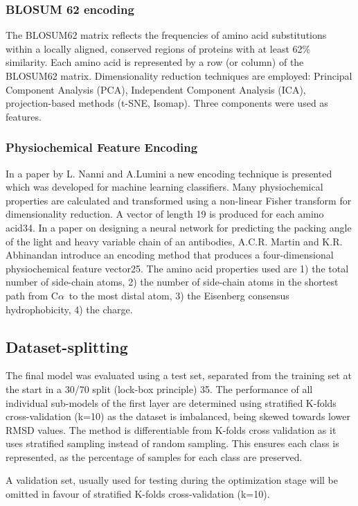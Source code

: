 \documentclass[12pt]{article}
\newcommand{\ca}{\mbox{C$\alpha$}}
\begin{document}
\subsubsection{BLOSUM 62 encoding}
The BLOSUM62 matrix reflects the frequencies of amino acid
substitutions within a locally aligned, conserved regions of proteins
with at least 62\% similarity. Each amino acid is represented by a row
(or column) of the BLOSUM62 matrix. Dimensionality reduction
techniques are employed: Principal Component Analysis (PCA),
Independent Component Analysis (ICA), projection-based methods (t-SNE,
Isomap). Three components were used as features.

\subsubsection{Physiochemical Feature Encoding}
In a paper by L. Nanni and A.Lumini a new encoding technique is
presented which was developed for machine learning classifiers. Many
physiochemical properties are calculated and transformed using a
non-linear Fisher transform for dimensionality reduction.  A vector of
length 19 is produced for each amino acid34.  In a paper on designing
a neural network for predicting the packing angle of the light and
heavy variable chain of an antibodies, A.C.R. Martin and
K.R. Abhinandan introduce an encoding method that produces a
four-dimensional physiochemical feature vector25. The amino acid
properties used are 1) the total number of side-chain atoms, 2) the
number of side-chain atoms in the shortest path from \ca\ to the most
distal atom, 3) the Eisenberg consensus
hydrophobicity\cite{Eisenberg1982}, 4) the charge.

\subsection{Dataset-splitting}
The final model was evaluated using a test set, separated from the
training set at the start in a 30/70 split (lock-box principle)
35. The performance of all individual sub-models of the first layer
are determined using stratified K-folds cross-validation (k=10) as the
dataset is imbalanced, being skewed towards lower RMSD values. The
method is differentiable from K-folds cross validation as it uses
stratified sampling instead of random sampling. This ensures each
class is represented, as the percentage of samples for each class are
preserved.

A validation set, usually used for testing during the optimization
stage will be omitted in favour of stratified K-folds cross-validation
(k=10)\cite{Krstajic2014,Kohavi1995}.
\end{document}
